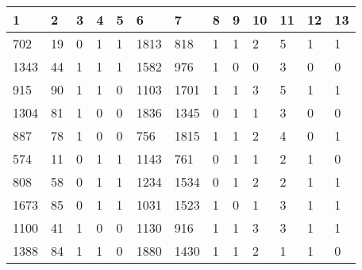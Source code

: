 \begin{table}[H]
\begin{tabular}{|l|l|l|l|l|l|l|l|l|l|l|l|l|}
\hline
\textbf{1} & \textbf{2} & \textbf{3} & \textbf{4} & \textbf{5} & \textbf{6} & \textbf{7} & \textbf{8} & \textbf{9} & \textbf{10} & \textbf{11} & \textbf{12} & \textbf{13} \\ \hline
702        & 19         & 0          & 1          & 1          & 1813       & 818        & 1          & 1          & 2           & {\color[HTML]{FE0000}5}           & 1           & 1           \\ \hline
1343       & 44         & 1          & 1          & 1          & 1582       & 976        & 1          & 0          & 0           & 3           & 0           & 0           \\ \hline
915        & 90         & 1          & 1          & 0          & 1103       & 1701       & 1          & 1          & {\color[HTML]{FE0000}3}           & {\color[HTML]{FE0000}5}           & 1           & 1           \\ \hline
1304       & 81         & 1          & 0          & 0          & 1836       & 1345       & 0          & 1          & 1           & 3           & 0           & 0           \\ \hline
887        & 78         & 1          & 0          & 0          & 756        & 1815       & 1          & 1          & 2           & 4           & 0           & 1           \\ \hline
574        & 11         & 0          & 1          & 1          & 1143       & 761        & 0          & 1          & 1           & 2           & 1           & 0           \\ \hline
808        & 58         & 0          & 1          & 1          & 1234       & 1534       & 0          & 1          & 2           & 2           & 1           & 1           \\ \hline
1673       & 85         & 0          & 1          & 1          & 1031       & 1523       & 1          & 0          & 1           & 3           & 1           & 1           \\ \hline
1100       & 41         & 1          & 0          & 0          & 1130       & 916        & 1          & 1          & {\color[HTML]{FE0000}3}           & 3           & 1           & 1           \\ \hline
1388       & 84         & 1          & 1          & 0          & 1880       & 1430       & 1          & 1          & 2           & 1           & 1           & 0           \\ \hline

\end{tabular}
\end{table}
